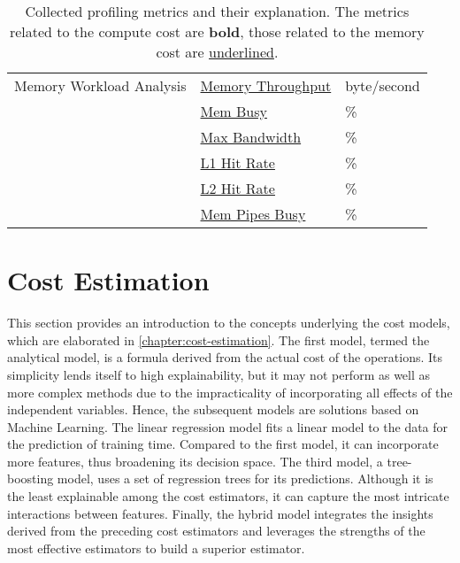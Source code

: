 \begin{table}[t]
\begin{tabular}{lll}
        Memory Workload Analysis      & \underline{Memory Throughput}        & byte/second  \\
                                      & \underline{Mem Busy}                 & \%           \\
                                      & \underline{Max Bandwidth}            & \%           \\
                                      & \underline{L1 Hit Rate}              & \%           \\
                                      & \underline{L2 Hit Rate}              & \%           \\
                                      & \underline{Mem Pipes Busy}           & \%           \\
        \bottomrule
    \end{tabular}
    \caption[Collected profiling metrics and their explanation]{Collected profiling metrics and their explanation. The metrics related to the compute cost are \textbf{bold}, those related to the memory cost are \underline{underlined}.}
    \label{tab:4-profiling-metrics}
\end{table}


\section{Cost Estimation}
\label{sec:4-cost-estimation}
This section provides an introduction to the concepts underlying the cost models, which are elaborated in \autoref{chapter:cost-estimation}. The first model, termed the analytical model, is a formula derived from the actual cost of the operations. Its simplicity lends itself to high explainability, but it may not perform as well as more complex methods due to the impracticality of incorporating all effects of the independent variables. Hence, the subsequent models are solutions based on Machine Learning. The linear regression model fits a linear model to the data for the prediction of training time. Compared to the first model, it can incorporate more features, thus broadening its decision space. The third model, a tree-boosting model, uses a set of regression trees for its predictions. Although it is the least explainable among the cost estimators, it can capture the most intricate interactions between features. Finally, the hybrid model integrates the insights derived from the preceding cost estimators and leverages the strengths of the most effective estimators to build a superior estimator.

